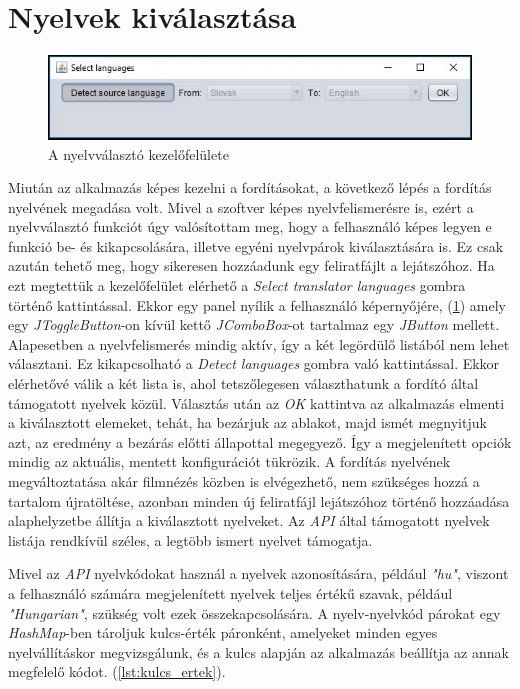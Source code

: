 \section{Nyelvek kiválasztása}

\begin{figure}[h!]
  \includegraphics[width=\linewidth]{images/language_selection.jpg}
  \caption{A nyelvválasztó kezelőfelülete}
  \label{fig:language_selection}
\end{figure}

Miután az alkalmazás képes kezelni a fordításokat, a következő lépés a fordítás nyelvének megadása volt. Mivel a szoftver képes nyelvfelismerésre is, ezért a nyelvválasztó funkciót úgy valósítottam meg, hogy a felhasználó képes legyen e funkció be- és kikapcsolására, illetve egyéni nyelvpárok kiválasztására is.  Ez csak azután tehető meg, hogy sikeresen hozzáadunk egy feliratfájlt a lejátszóhoz. Ha ezt megtettük a kezelőfelület elérhető a \textit{Select translator languages} gombra történő kattintással.  Ekkor egy panel nyílik a felhasználó képernyőjére, (\ref{fig:language_selection}) amely egy \textit{JToggleButton}-on kívül kettő \textit{JComboBox}-ot tartalmaz egy \textit{JButton} mellett. Alapesetben a nyelvfelismerés mindig aktív, így a két legördülő listából nem lehet választani. Ez kikapcsolható a \textit{Detect languages} gombra való kattintással. Ekkor elérhetővé válik a két lista is, ahol tetszőlegesen választhatunk a fordító által támogatott nyelvek közül. Választás után az \textit{OK} kattintva az alkalmazás elmenti a kiválasztott elemeket, tehát, ha bezárjuk az ablakot, majd ismét megnyitjuk azt, az eredmény a bezárás előtti állapottal megegyező. Így a megjelenített opciók mindig az aktuális, mentett konfigurációt tükrözik. A fordítás nyelvének megváltoztatása akár filmnézés közben is elvégezhető, nem szükséges hozzá a tartalom újratöltése, azonban minden új feliratfájl lejátszóhoz történő hozzáadása alaphelyzetbe állítja a kiválasztott nyelveket. Az \textit{API} által támogatott nyelvek listája rendkívül széles, a legtöbb ismert nyelvet támogatja.

Mivel az \textit{API} nyelvkódokat használ a nyelvek azonosítására, például \textit{"hu"}, viszont a felhasználó számára megjelenített nyelvek teljes értékű szavak, például \textit{"Hungarian"}, szükség volt ezek összekapcsolására. A nyelv-nyelvkód párokat egy \textit{HashMap}-ben tároljuk kulcs-érték páronként, amelyeket minden egyes nyelvállításkor megvizsgálunk, és  a kulcs alapján az alkalmazás beállítja az annak megfelelő kódot. (\ref{lst:kulcs_ertek}).

